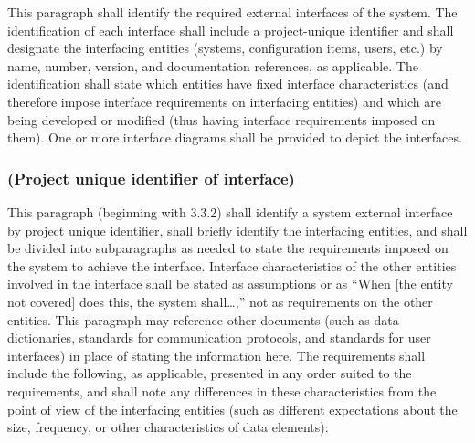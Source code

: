 \documentclass{fidata-report-template}
\begin{document}
This paragraph shall identify the required external interfaces of the
system. The identification of each interface shall include a
project-unique identifier and shall designate the interfacing entities
(systems, configuration items, users, etc.) by name, number, version,
and documentation references, as applicable. The identification shall
state which entities have fixed interface characteristics (and therefore
impose interface requirements on interfacing entities) and which are
being developed or modified (thus having interface requirements imposed
on them). One or more interface diagrams shall be provided to depict the
interfaces.

\subsubsection{(Project unique identifier of interface)}

This paragraph (beginning with 3.3.2) shall identify a system external
interface by project unique identifier, shall briefly identify the
interfacing entities, and shall be divided into subparagraphs as needed
to state the requirements imposed on the system to achieve the
interface. Interface characteristics of the other entities involved in
the interface shall be stated as assumptions or as ``When {[}the entity
not covered{]} does this, the system shall\ldots{},'' not as
requirements on the other entities. This paragraph may reference other
documents (such as data dictionaries, standards for communication
protocols, and standards for user interfaces) in place of stating the
information here. The requirements shall include the following, as
applicable, presented in any order suited to the requirements, and shall
note any differences in these characteristics from the point of view of
the interfacing entities (such as different expectations about the size,
frequency, or other characteristics of data elements):
\end{document}
